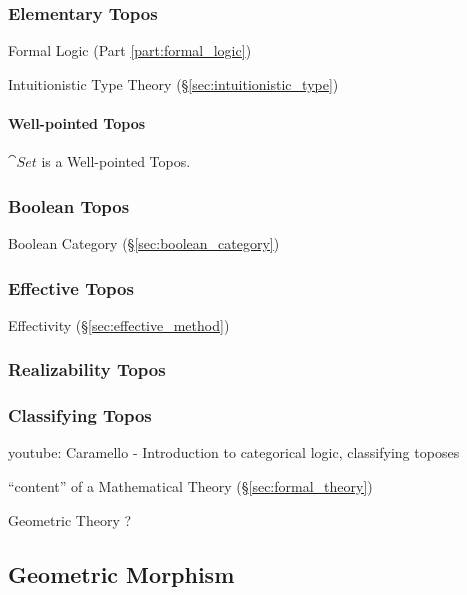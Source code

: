 \subsubsection{Elementary Topos}\label{sec:elementary_topos}

Formal Logic (Part \ref{part:formal_logic})

Intuitionistic Type Theory (\S\ref{sec:intuitionistic_type})



\paragraph{Well-pointed Topos}\label{sec:wellpointed_topos}\hfill

$\cat{Set}$ is a Well-pointed Topos.



\subsubsection{Boolean Topos}\label{sec:boolean_topos}

Boolean Category (\S\ref{sec:boolean_category})



\subsubsection{Effective Topos}\label{sec:effective_topos}

Effectivity (\S\ref{sec:effective_method})



\subsubsection{Realizability Topos}\label{sec:realizability_topos}

\subsubsection{Classifying Topos}\label{sec:classifying_topos}

youtube: Caramello - Introduction to categorical logic, classifying
toposes

``content'' of a Mathematical Theory (\S\ref{sec:formal_theory})

Geometric Theory ?



\subsection{Geometric Morphism}\label{sec:geometric_morphism}

